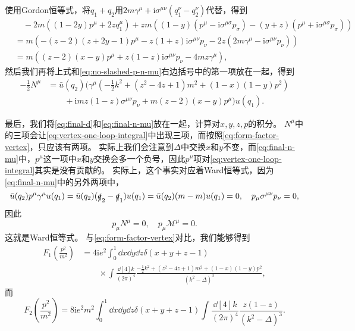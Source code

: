 \documentclass[hyperref, UTF8, a4paper]{ctexart}
\newcommand*{\ii}{\mathrm{i}}
\begin{document}
使用Gordon恒等式，将$q_1 + q_2$用$2m \gamma^\mu + \ii \sigma^{\mu \nu}(q_1^\nu - q_2^\nu)$代替，得到
\[
    \begin{aligned}
        &\quad - 2m ((1-2y) p^\mu + 2z q_1^\mu) + zm((1-y) (p^\mu - \ii \sigma^{\mu \sigma} p_\sigma) - (y+z) (p^\mu + \ii \sigma^{\mu \sigma} p_\sigma)) \\
        &= m(- (z-2)(z+2y-1) p^\mu - z(1+z) \ii \sigma^{\mu \nu} p_\nu - 2z (2m \gamma^\mu - \ii \sigma^{\mu \nu} p_\nu)) \\
        &= m((z-2)(x-y) p^\mu + z(1 - z) \ii \sigma^{\mu \nu} p_\nu - 4mz \gamma^\mu ) ,
    \end{aligned}
\]
然后我们再将上式和\eqref{eq:no-slashed-p-n-mu}右边括号中的第一项放在一起，得到
\begin{equation}
    \begin{aligned}
        - \frac{1}{2} N^\mu &= \bar{u}(q_2) (\gamma^\mu (- \frac{1}{2} k^2 + (z^2 - 4z + 1) m^2 + (1-x)(1-y) p^2) \\
        &\quad \quad + \ii m z (1-z) \sigma^{\mu \nu} p_\nu + m (z-2) (x-y) p^\mu) u(q_1).
    \end{aligned}
    \label{eq:final-n-mu}
\end{equation}

最后，我们将\eqref{eq:final-d}和\eqref{eq:final-n-mu}放在一起，计算对$x, y, z, p$的积分。
$N^\mu$中的三项会让\eqref{eq:vertex-one-loop-integral}中出现三项，而按照\eqref{eq:form-factor-vertex}，只应该有两项。
实际上我们会注意到$\Delta$中交换$x$和$y$不变，而\eqref{eq:final-n-mu}中，$p^\mu$这一项中$x$和$y$交换会多一个负号，因此$p^\mu$项对\eqref{eq:vertex-one-loop-integral}其实是没有贡献的。
实际上，这个事实对应着Ward恒等式，因为\eqref{eq:final-n-mu}中的另外两项中，
\[
    \bar{u}(q_2) p^\mu \gamma^\mu u(q_1) = \bar{u}(q_2) (\slashed{q}_2 - \slashed{q}_1) u(q_1) = \bar{u}(q_2) (m - m)u(q_1) = 0, \quad p_\mu \sigma^{\mu \nu} p_\nu = 0,
\]
因此
\[
    p_\mu N^\mu = 0, \quad p_\mu \mathcal{M}^\mu = 0.
\]
这就是Ward恒等式。
与\eqref{eq:form-factor-vertex}对比，我们能够得到
\begin{equation}
    \begin{aligned}
        F_1\left(\frac{p^2}{m^2}\right) &= 4 \ii e^2 \int_0^1 \dd{x} \dd{y} \dd{z} \delta(x + y + z - 1) \\
        &\quad \quad \times \int \frac{\dd[4]{k}}{(2\pi)^4} \frac{- \frac{1}{2} k^2 + (z^2 - 4z + 1) m^2 + (1-x) (1-y) p^2}{(k^2 - \Delta)^3},
    \end{aligned}
    \label{eq:f1-in-4d}
\end{equation}
而
\begin{equation}
    F_2\left(\frac{p^2}{m^2}\right) = 8 \ii e^2 m^2 \int_0^1 \dd{x} \dd{y} \dd{z} \delta(x + y + z - 1) \int \frac{\dd[4]{k}}{(2\pi)^4} \frac{z(1-z)}{(k^2 - \Delta)^3}.
\end{equation}
\end{document}
